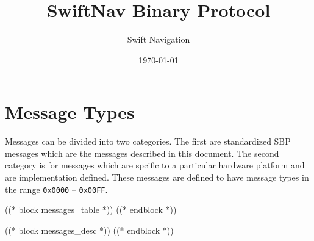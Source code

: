 \documentclass{article}
\title{SwiftNav Binary Protocol}
\author{Swift Navigation}
\date{\today}
\numberwithin{table}{subsection}
\numberwithin{field}{subsection}
\begin{document}
\maketitle

\thispagestyle{firstpage}

\section{Message Types}
\label{sec:Messages}

Messages can be divided into two categories. The first are standardized SBP
messages which are the messages described in this document. The second category
is for messages which are spcific to a particular hardware platform and are
implementation defined. These messages are defined to have message types in the
range \texttt{0x0000} -- \texttt{0x00FF}.

((* block messages_table *))
((* endblock *))


((* block messages_desc *))
((* endblock *))
\end{document}
